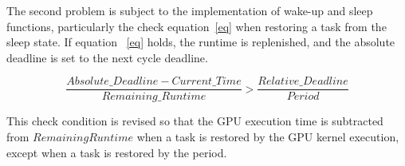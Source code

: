The second problem is subject to the implementation of wake-up and sleep functions, particularly the check equation~\eqref{eq} when restoring a task from the sleep state.
If equation ~\eqref{eq} holds, the runtime is replenished, and the absolute deadline is set to the next cycle deadline.

{\scriptsize
\begin{equation}
\frac{Absolute\_Deadline - Current\_Time}{Remaining\_Runtime} > \frac{Relative\_Deadline}{Period} \label{eq}
\end{equation}
}

This check condition is revised so that the GPU execution time is subtracted from $Remaining Runtime$ when a task is restored by the GPU kernel execution, except when a task is restored by the period.
